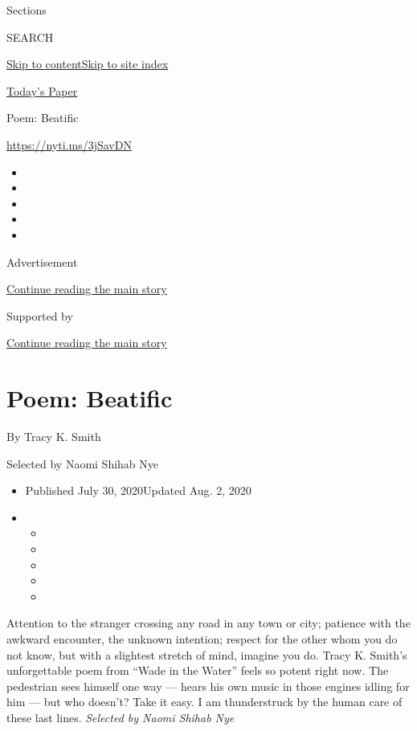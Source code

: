 Sections

SEARCH

\protect\hyperlink{site-content}{Skip to
content}\protect\hyperlink{site-index}{Skip to site index}

\href{https://myaccount.nytimes.com/auth/login?response_type=cookie\&client_id=vi}{}

\href{https://www.nytimes.com/section/todayspaper}{Today's Paper}

Poem: Beatific

\url{https://nyti.ms/3jSavDN}

\begin{itemize}
\item
\item
\item
\item
\item
\end{itemize}

Advertisement

\protect\hyperlink{after-top}{Continue reading the main story}

Supported by

\protect\hyperlink{after-sponsor}{Continue reading the main story}

\hypertarget{poem-beatific}{%
\section{Poem: Beatific}\label{poem-beatific}}

By Tracy K. Smith

Selected by Naomi Shihab Nye

\begin{itemize}
\item
  Published July 30, 2020Updated Aug. 2, 2020
\item
  \begin{itemize}
  \item
  \item
  \item
  \item
  \item
  \end{itemize}
\end{itemize}

Attention to the stranger crossing any road in any town or city;
patience with the awkward encounter, the unknown intention; respect for
the other whom you do not know, but with a slightest stretch of mind,
imagine you do. Tracy K. Smith's unforgettable poem from ``Wade in the
Water'' feels so potent right now. The pedestrian sees himself one way
--- hears his own music in those engines idling for him --- but who
doesn't? Take it easy. I am thunderstruck by the human care of these
last lines. \emph{Selected by Naomi Shihab Nye}

